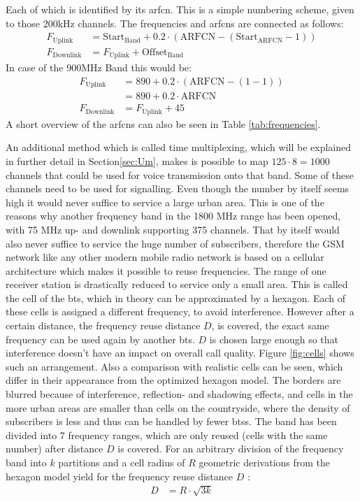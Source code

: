 Each of which is identified by its \gls{arfcn}.
This is a simple numbering scheme, given to those 200kHz channels.
The frequencies and \glspl{arfcn} are connected as follows:
\begin{align}
F_\text{Uplink} 	&= \text{Start}_\text{Band} + 0.2 \cdot (\text{ARFCN} -(\text{Start}_\text{ARFCN} -1))\\
F_\text{Downlink}   &= F_\text{Uplink} + \text{Offset}_\text{Band}
\end{align}
In case of the 900MHz Band this would be:
\begin{align}
F_\text{Uplink}		&=890 + 0.2 \cdot (\text{ARFCN} - (1-1))\\
					&=890 + 0.2 \cdot \text{ARFCN}\\
F_\text{Downlink}	&=F_\text{Uplink} + 45
\end{align}
A short overview of the \glspl{arfcn} can also be seen in Table \ref{tab:frequencies}.

An additional method which is called time multiplexing, which will be explained in further detail in Section\ref{sec:Um}, makes is possible to map $125 \cdot 8 = 1000$ channels that could be used for voice transmission onto that band.
Some of these channels need to be used for signalling.
Even though the number by itself seems high it would never suffice to service a large urban area.
This is one of the reasons why another frequency band in the 1800 MHz range has been opened, with 75 MHz up- and downlink supporting 375 channels.
That by itself would also never suffice to service the huge number of subscribers, therefore the GSM network like any other modern mobile radio network is based on a cellular architecture which makes it possible to reuse frequencies.
The range of one receiver station is drastically reduced to service only a small area.
This is called the cell of the \gls{bts}, which in theory can be approximated by a hexagon.
Each of these cells is assigned a different frequency, to avoid interference.
However after a certain distance, the frequency reuse distance $D$, is covered, the exact same frequency can be used again by another \gls{bts}.
$D$ is chosen large enough so that interference doesn't have an impact on overall call quality.
Figure \ref{fig:cells} shows such an arrangement.
Also a comparison with realistic cells can be seen, which differ in their appearance from the optimized hexagon model.
The borders are blurred because of interference, reflection- and shadowing effects, and cells in the more urban areas are smaller than cells on the countryside, where the density of subscribers is less and thus can be handled by fewer \glspl{bts}.
The band has been divided into 7 frequency ranges, which are only reused (cells with the same number) after distance $D$ is covered.
For an arbitrary division of the frequency band into $k$ partitions and a cell radius of $R$ geometric derivations from the hexagon model yield for the frequency reuse distance $D$ \cite{GSM2009}:
\begin{align}
D	&=R\cdot\sqrt{3k}
\end{align}

